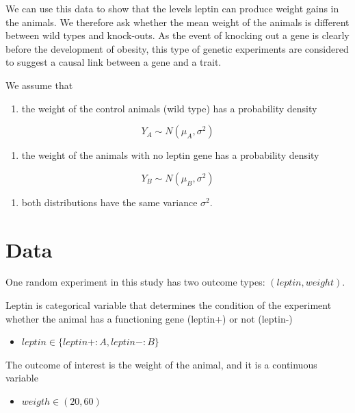 \documentclass[
]{book}
\providecommand{\tightlist}{%
  \setlength{\itemsep}{0pt}\setlength{\parskip}{0pt}}
\begin{document}
We can use this data to show that the levels leptin can produce weight gains in the animals. We therefore ask whether the mean weight of the animals is different between wild types and knock-outs. As the event of knocking out a gene is clearly before the development of obesity, this type of genetic experiments are considered to suggest a causal link between a gene and a trait.

We assume that

\begin{enumerate}
\def\labelenumi{\arabic{enumi}.}
\tightlist
\item
  the weight of the control animals (wild type) has a probability density
\end{enumerate}

\[Y_A \sim N(\mu_A, \sigma^2)\]

\begin{enumerate}
\def\labelenumi{\arabic{enumi}.}
\setcounter{enumi}{1}
\tightlist
\item
  the weight of the animals with no leptin gene has a probability density
\end{enumerate}

\[Y_B \sim N(\mu_B, \sigma^2)\]

\begin{enumerate}
\def\labelenumi{\arabic{enumi}.}
\setcounter{enumi}{2}
\tightlist
\item
  both distributions have the same variance \(\sigma^2\).
\end{enumerate}

\hypertarget{data-3}{%
\section{Data}\label{data-3}}

One random experiment in this study has two outcome types: \((leptin, weight)\).

Leptin is categorical variable that determines the condition of the experiment whether the animal has a functioning gene (leptin+) or not (leptin-)

\begin{itemize}
\tightlist
\item
  \(leptin \in \{leptin+:A,leptin-:B\}\)
\end{itemize}

The outcome of interest is the weight of the animal, and it is a continuous variable

\begin{itemize}
\tightlist
\item
  \(weigth \in (20, 60)\)
\end{itemize}
\end{document}
